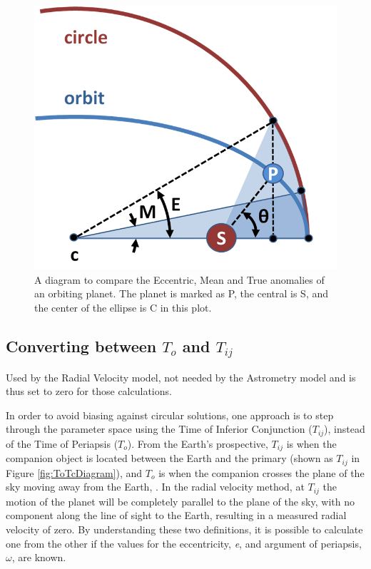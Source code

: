 \documentclass[12pt,preprint]{aastex}
\begin{document}
\begin{figure}[ht]
\begin{center}
\includegraphics[scale=0.4]{Figures/Anomalies-MOD.png}
\caption[Diagram of Anomalies]{A diagram to compare the Eccentric, Mean and True anomalies of an orbiting planet.  The planet is marked as P, the central is S, and the center of the ellipse is C in this plot. }
\label{fig:Anomalies}
\end{center}
\end{figure}
\subsection{Converting between $T_o$ and $T_{ij}$}\label{sec:ToTcCalculator}

Used by the Radial Velocity model, not needed by the Astrometry model and is thus set to zero for those calculations.

In order to avoid biasing against circular solutions, one approach is to step through the parameter space using the Time of Inferior Conjunction ($T_{ij}$), instead of the Time of Periapsis ($T_o$).  From the Earth's prospective, $T_{ij}$ is when the companion object is located between the Earth and the primary (shown as {\color{green}$T_{ij}$} in Figure \ref{fig:ToTcDiagram}), and $T_o$ is when the companion crosses the plane of the sky moving away from the Earth, \citep{heintz}.  In the radial velocity method, at $T_{ij}$ the motion of the planet will be completely parallel to the plane of the sky, with no component along the line of sight to the Earth, resulting in a measured radial velocity of zero.  By understanding these two definitions, it is possible to calculate one from the other if the values for the eccentricity, {\it e}, and argument of periapsis, $\omega$, are known.
\end{document}
